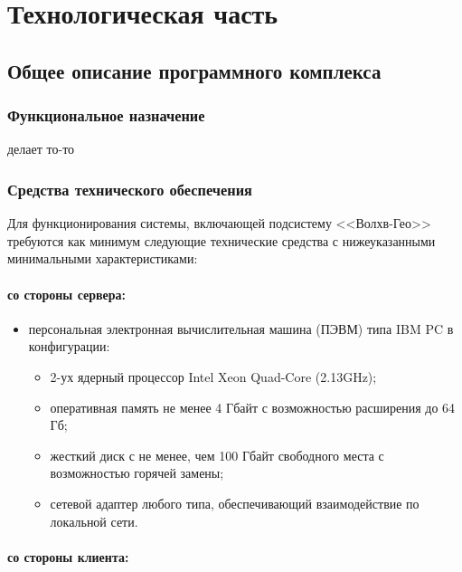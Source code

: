 \section{Технологическая часть}

\subsection{Общее описание программного комплекса}
\subsubsection{Функциональное назначение}

делает то-то

\subsubsection{Средства технического обеспечения}

Для функционирования системы, включающей подсистему <<Волхв-Гео>> требуются как минимум следующие технические средства с нижеуказанными минимальными характеристиками:
\paragraph*{со стороны сервера:} \hfill


\begin{itemize}
\item персональная электронная вычислительная машина (ПЭВМ) типа IBM PC в
конфигурации:

\begin{itemize}
\item 2-ух ядерный процессор Intel Xeon Quad-Core (2.13GHz);
\item оперативная память не менее 4 Гбайт с возможностью расширения до 64 Гб;
\item жесткий диск с не менее, чем 100 Гбайт свободного места с возможностью горячей замены;
\item сетевой адаптер любого типа, обеспечивающий взаимодействие по локальной сети.
\end{itemize}
\end{itemize}

\paragraph*{со стороны клиента:} \hfill

